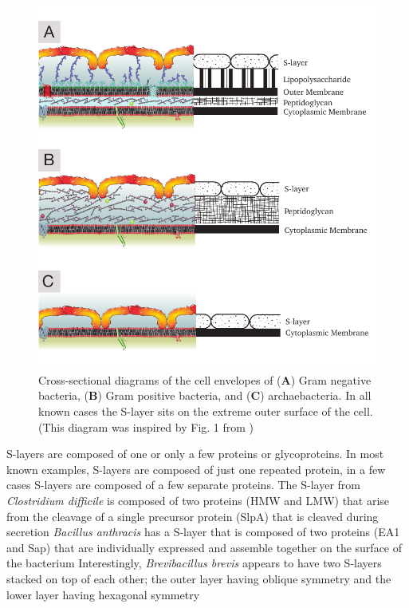 \begin{figure}[htb] %
  \begin{center}
    \includegraphics{intro/img/celwalls.pdf}
  \end{center}
  \caption[Cross-sectional diagrams of \ac{S-layer} containing cell envelopes]{Cross-sectional
    diagrams of the cell envelopes of (\textbf{A}) Gram negative bacteria, (\textbf{B}) Gram
    positive bacteria, and (\textbf{C}) archaebacteria. In all known cases the \ac{S-layer} sits on
    the extreme outer surface of the cell. (This diagram was inspired by Fig. 1 from
    )}
  \label{fig:cellwalls}
\end{figure}

\Acp{S-layer} are composed of one or only a few proteins or glycoproteins. In most known examples,
\acp{S-layer} are composed of just one repeated protein, in a few cases \acp{S-layer} are composed
of a few separate proteins. The \ac{S-layer} from \textit{Clostridium difficile} is composed of two
proteins (HMW and LMW) that arise from the cleavage of a single precursor protein (SlpA) that is
cleaved during secretion \textit{Bacillus
  anthracis} has a \ac{S-layer} that is composed of two proteins (EA1 and Sap) that are individually
expressed and assemble together on the surface of the bacterium
Interestingly, \textit{Brevibacillus brevis} appears to have two \acp{S-layer} stacked on top of each
other; the outer layer having oblique symmetry and the lower layer having hexagonal
symmetry
    
